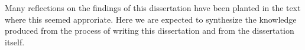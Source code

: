 \FloatBarrier
\label{sec:reflections}

Many reflections on the findings of this dissertation have been planted in the
text where this seemed approriate. Here we are expected to synthesize the
knowledge produced from the process of writing this dissertation and from the
dissertation itself.

